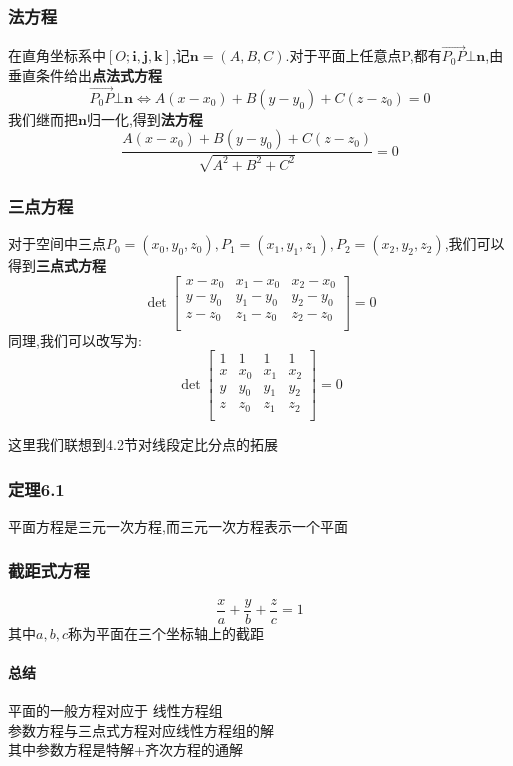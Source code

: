 \documentclass{article}
\newcommand{\ve}{\boldsymbol}
\begin{document}
\begin{CJK}{UTF8}{gkai}
\subsubsection*{法方程}
在直角坐标系中$[O;\ve{i},\ve{j},\ve{k}]$,记$\ve{n}=(A,B,C)$.对于平面上任意点P,都有$\overrightarrow{P_0P}\bot\ve{n}$,由垂直条件给出\textbf{点法式方程}\\
\[\overrightarrow{P_0P}\bot\ve{n}\Leftrightarrow A(x-x_0)+B(y-y_0)+C(z-z_0)=0\]
我们继而把$\ve{n}$归一化,得到\textbf{法方程}\\
\[\dfrac{A(x-x_0)+B(y-y_0)+C(z-z_0)}{\sqrt{A^2+B^2+C^2}}=0\]
\subsubsection*{三点方程}
对于空间中三点$P_0=(x_0,y_0,z_0),P_1=(x_1,y_1,z_1),P_2=(x_2,y_2,z_2)$,我们可以得到\textbf{三点式方程}
\[\det\begin{bmatrix}
    x-x_0&x_1-x_0&x_2-x_0\\
    y-y_0&y_1-y_0&y_2-y_0\\
    z-z_0&z_1-z_0&z_2-z_0\\   
    \end{bmatrix}=0\]
同理,我们可以改写为:\\
\[\det\begin{bmatrix}
    1&1&1&1\\
    x&x_0&x_1&x_2\\
    y&y_0&y_1&y_2\\
    z&z_0&z_1&z_2\\   
    \end{bmatrix}=0\]

这里我们联想到4.2节对线段定比分点的拓展\\
\subsubsection*{定理6.1}
平面方程是三元一次方程,而三元一次方程表示一个平面\\
\subsubsection*{截距式方程}
\[\dfrac{x}{a}+\dfrac{y}{b}+\dfrac{z}{c}=1\]
其中$a,b,c$称为平面在三个坐标轴上的截距\\

\paragraph{总结\\}
平面的一般方程对应于 线性方程组\\
参数方程与三点式方程对应线性方程组的解\\
其中参数方程是特解+齐次方程的通解\\

\end{CJK}
\end{document}
